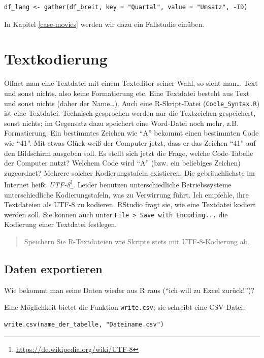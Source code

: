 \documentclass[12pt,ngerman,]{book}
\let\rmarkdownfootnote\footnote%
\def\footnote{\protect\rmarkdownfootnote}
\begin{document}
\begin{verbatim}
df_lang <- gather(df_breit, key = "Quartal", value = "Umsatz", -ID)
\end{verbatim}

In Kapitel \ref{case-movies} werden wir dazu ein Fallstudie einüben.

\section{Textkodierung}\label{textkodierung}

Öffnet man eine Textdatei mit einem Texteditor seiner Wahl, so sieht
man\ldots{} Text und sonst nichts, also keine Formatierung etc. Eine
Textdatei besteht aus Text und sonst nichts (daher der Name\ldots{}).
Auch eine R-Skript-Datei (\texttt{Coole\_Syntax.R}) ist eine Textdatei.
Technisch gesprochen werden nur die Textzeichen gespeichert, sonst
nichts; im Gegensatz dazu speichert eine Word-Datei noch mehr, z.B.
Formatierung. Ein bestimmtes Zeichen wie ``A'' bekommt einen bestimmten
Code wie ``41''. Mit etwas Glück weiß der Computer jetzt, dass er das
Zeichen ``41'' auf den Bildschirm ausgeben soll. Es stellt sich jetzt
die Frage, welche Code-Tabelle der Computer nutzt? Welchem Code wird
``A'' (bzw. ein beliebiges Zeichen) zugeordnet? Mehrere solcher
Kodierungstafeln existieren. Die gebräuchlichste im Internet heißt
\emph{UTF-8}\footnote{\url{https://de.wikipedia.org/wiki/UTF-8}}. Leider
benutzen unterschiedliche Betriebssysteme unterschiedliche
Kodierungstafeln, was zu Verwirrung führt. Ich empfehle, ihre
Textdateien als UTF-8 zu kodieren. RStudio fragt sie, wie eine Textdatei
kodiert werden soll. Sie können auch unter
\texttt{File\ \textgreater{}\ Save\ with\ Encoding...} die Kodierung
einer Textdatei festlegen.

\begin{quote}
Speichern Sie R-Textdateien wie Skripte stets mit UTF-8-Kodierung ab.
\end{quote}

\subsection{Daten exportieren}\label{daten-exportieren}

Wie bekommt man seine Daten wieder aus R raus (``ich will zu Excel
zurück!'')?

Eine Möglichkeit bietet die Funktion \texttt{write.csv}; sie schreibt
eine CSV-Datei:

\begin{verbatim}
write.csv(name_der_tabelle, "Dateiname.csv")
\end{verbatim}
\end{document}
